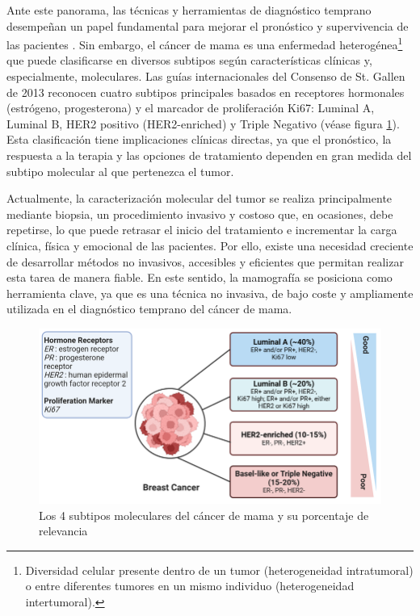 \documentclass[a4paper,10pt]{book}
\begin{document}
Ante este panorama, las técnicas y herramientas de diagnóstico temprano desempeñan un papel fundamental para mejorar el pronóstico y supervivencia de las pacientes \cite{wang_early_2017}. Sin embargo, el cáncer de mama es una enfermedad heterogénea\footnote{Diversidad celular presente dentro de un tumor (heterogeneidad intratumoral) o entre diferentes tumores en un mismo individuo (heterogeneidad intertumoral).} que puede clasificarse en diversos subtipos según características clínicas y, especialmente, moleculares. Las guías internacionales del Consenso de St. Gallen de 2013 \cite{goldhirsch_personalizing_2013} reconocen cuatro subtipos principales basados en receptores hormonales (estrógeno, progesterona) y el marcador de proliferación Ki67: Luminal A, Luminal B, HER2 positivo (HER2-enriched) y Triple Negativo (véase figura \ref{fig:subtypes}). Esta clasificación tiene implicaciones clínicas directas, ya que el pronóstico, la respuesta a la terapia y las opciones de tratamiento dependen en gran medida del subtipo molecular al que pertenezca el tumor.

Actualmente, la caracterización molecular del tumor se realiza principalmente mediante biopsia, un procedimiento invasivo y costoso que, en ocasiones, debe repetirse, lo que puede retrasar el inicio del tratamiento e incrementar la carga clínica, física y emocional de las pacientes. Por ello, existe una necesidad creciente de desarrollar métodos no invasivos, accesibles y eficientes que permitan realizar esta tarea de manera fiable. En este sentido, la mamografía se posiciona como herramienta clave, ya que es una técnica no invasiva, de bajo coste y ampliamente utilizada en el diagnóstico temprano del cáncer de mama.


\begin{figure}
	\centering
	\includegraphics[width=0.8\linewidth]{reports/assets/subtypes.png}
	\caption{Los 4 subtipos moleculares del cáncer de mama y su porcentaje de relevancia \cite{harnessing_2024}}
	\label{fig:subtypes}
\end{figure}
\end{document}
